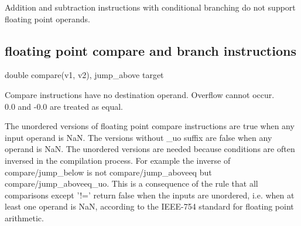 \documentclass[forwardcom.tex]{subfiles}
\begin{document}
Addition and subtraction instructions with conditional branching do not support floating point operands.
\vv


\subsection{floating point compare and branch instructions}
double compare(v1, v2), jump\_above target
\vv

Compare instructions have no destination operand. 
Overflow cannot occur. \\
0.0 and -0.0 are treated as equal.
\vv

The unordered versions of floating point compare instructions are true when any input operand is NaN. The versions without \_uo suffix are false when any operand is NaN. 
The unordered versions are needed because conditions are often inversed in the compilation process. For example the inverse of compare/jump\_below is not compare/jump\_aboveeq but compare/jump\_aboveeq\_uo. This is a consequence of the rule that  all comparisons except '!=' return false when the inputs are unordered, i.e. when at least one operand is NaN, according to the IEEE-754 standard for floating point arithmetic.
\vspace{4mm}
\end{document}
